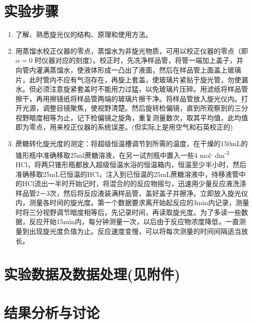 \documentclass[11pt]{report}
\begin{document}
\chapter{实验步骤}
\label{sec:org6856cd8}
\begin{enumerate}
\item 了解、熟悉旋光仪的结构、原理和使用方法。
\item 用蒸馏水校正仪器的零点，蒸馏水为非旋光物质，可用以校正仪器的零点（即\(\alpha=0\) 时仪器对应的刻度）。校正时，先冼净样品管，将管一端加上盖子，并向管内灌满蒸馏水，使液体形成一凸出了液面，然后在样品管上面盖上玻璃片，此时管内不应有气泡存在，再旋上套盖，使玻璃片紧贴于旋光管，勿使漏水。但必须注意旋紧套盖时不能用力过猛，以免玻璃片压碎。用滤纸将样品管擦干，再用擦镜纸将样品管两端的玻璃片擦干净。将样品管放入旋光仪内。打开光源，调整目镜聚焦，使视野清楚。然后旋转检偏镜，直到所观察到的三分视野暗度相等为止，记下检偏镜之旋角，重复测量数次，取其平均值，此均值即为零点，用来校正仪器的系统误差。(但实际上是用空气和石英校正的)
\item 蔗糖转化旋光度的测定：将超级恒温槽调节到所需的温度，在干燥的150mL的锥形瓶中准确移取25ml蔗糖溶液，在另一试剂瓶中置入一些4 mol\(\cdot\) dm\textsuperscript{-3} HCl，将两只锥形瓶都放入超级恒温水浴的恒温箱内，恒温至少半小时，然后准确移取25mL已恒温的HCl，注入到已恒温的25mL蔗糖溶液中，待移液管中的HCl流出一半时开始记时，将混合的的反应物摇匀，迅速用少量反应液洗涤样品管2－3次，然后将反应液装满样品管，盖好盖子并擦净。立即放入旋光仪内，测量各时间的旋光度。第一个数据要求离开始起反应的3min内记录，测量时将三分视野调节暗度相等后，先记录时间，再读取旋光度。为了多读一些数据，反应开始15min内，每分钟测量一次，以后由于反应物浓度降低，一直测量到出现旋光度负值为止。反应速度变慢，可以将每次测量的时间间隔适当放长。
\end{enumerate}

\chapter{实验数据及数据处理(见附件)}
\label{sec:org6e55f4e}
\chapter{结果分析与讨论}
\label{sec:org523e851}
\end{document}
